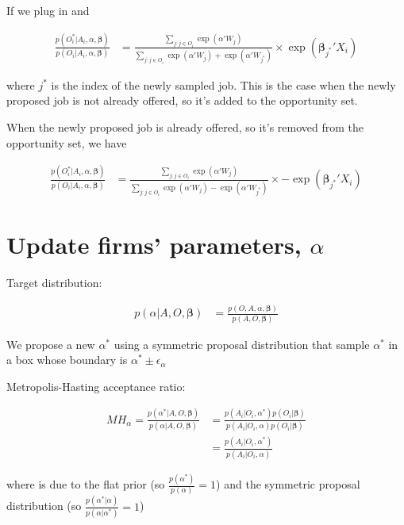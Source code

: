 \documentclass[12pt]{article}
\begin{document}
If we plug in  and 

\begin{align}
\frac{p(O_i^* | A_i, \alpha, \bm{\beta})}{p(O_i | A_i, \alpha, \bm{\beta})} &= \frac{\sum\limits_{j:j \in O_i} \exp(\alpha'W_j)}{\sum\limits_{j:j \in O_i} \exp(\alpha'W_j) + \exp(\alpha' W_{j^*})} \times \exp(\bm{\beta}_{j^*}'X_i)
\end{align}

where $j^*$ is the index of the newly sampled job. This is the case when the newly proposed job is not already offered, so it's added to the opportunity set.

When the newly proposed job is already offered, so it's removed from the opportunity set, we have

\begin{align}
\frac{p(O_i^* | A_i, \alpha, \bm{\beta})}{p(O_i | A_i, \alpha, \bm{\beta})} &= \frac{\sum\limits_{j:j \in O_i} \exp(\alpha'W_j)}{\sum\limits_{j:j \in O_i} \exp(\alpha'W_j) - \exp(\alpha' W_{j^*})} \times -\exp(\bm{\beta}_{j^*}'X_i)
\end{align}

\section{Update firms' parameters, $\alpha$}

Target distribution:

\begin{align}
p(\alpha | A, O, \bm{\beta}) &= \frac{p(O, A, \alpha, \bm{\beta})}{p(A, O, \bm{\beta})}
\end{align}

We propose a new $\alpha^*$ using a symmetric proposal distribution that sample $\alpha^*$ in a box whose boundary is $\alpha^* \pm \epsilon_\alpha$

Metropolis-Hasting acceptance ratio:

\begin{align}
MH_\alpha = \frac{p(\alpha^* | A, O, \bm{\beta})}{p(\alpha | A, O, \bm{\beta})} &= \frac{p(A_i | O_i, \alpha^*)p(O_i|\bm{\beta})}{p(A_i | O_i, \alpha)p(O_i|\bm{\beta})} \\
&= \frac{p(A_i | O_i, \alpha^*)}{p(A_i | O_i, \alpha)} \label{eq:updatealpha_MHratio_final}
\end{align}

where  is due to the flat prior (so $\frac{p(\alpha^*)}{p(\alpha)}=1$) and the symmetric proposal distribution (so $\frac{p(\alpha^*|\alpha)}{p(\alpha|\alpha^*)} = 1$)
\end{document}
